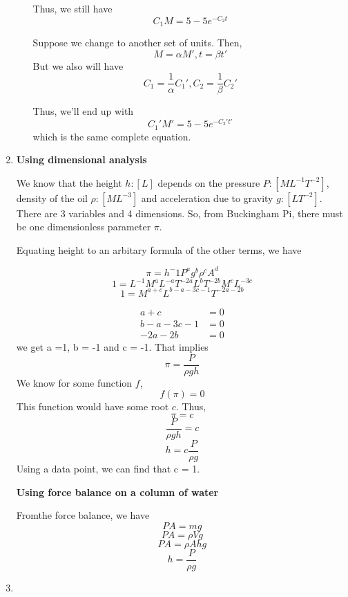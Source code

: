 \documentclass[letterpaper,12pt]{article}
\begin{document}
\begin{enumerate}
\begin{enumerate}
Thus, we still have
\[ C_1 M = 5 -5 e^{-C_2 t}\]

Suppose we change to another set of units. Then,
\[M = \alpha M' , t = \beta t'\]
But we also will have
\[C_1 = \frac{1}{\alpha} C_1' , C_2 = \frac{1}{\beta} C_2'\]

Thus, we'll end up with
\[ C_1' M' = 5 -5 e^{-C_2' t'}\]
which is the same complete equation.
\end{enumerate}

\item

\textbf{Using dimensional analysis}

We know that the height $h : [L]$ depends on the pressure $P: [ML^{-1}T^{-2}]$, density of the oil $\rho : [ML^{-3}]$ and acceleration due to gravity $g: [LT^{-2}]$. There are 3 variables and 4 dimensions. So, from Buckingham Pi, there must be one dimensionless parameter $\pi$.



Equating  height to an arbitary formula of the other terms, we have

\[\pi  = h^-1P^ag^b\rho^cA^d\]
\[1 = L^{-1}M^aL^{-a}T^{-2a}L^bT^{-2b}M^cL^{-3c}\]
\[1 = M^{a+c}L^{b-a-3c-1}T^{-2a-2b}\]

\begin{align*}
a+c&=0\\
b-a-3c-1&=0\\
-2a-2b &=0
\end{align*}
 we get a =1, b = -1 and c = -1. That implies
\[\pi  = \frac{P}{\rho g h}\]
We know for some function $f$,
\[f(\pi)=0\]
This function would have some root $c$. Thus,
\[\pi = c\]
\[\frac{P}{\rho g h}= c\]
\[h  = c \frac{P}{\rho g }\]
Using a data point, we can find that c = 1.


\textbf{Using force balance on a column of water }


Fromthe force balance, we have
\[PA = mg\]
\[PA = \rho V g\]
\[PA = \rho A h g\]
\[h = \frac{P}{\rho g}\]
\item


\end{enumerate}
\end{document}

